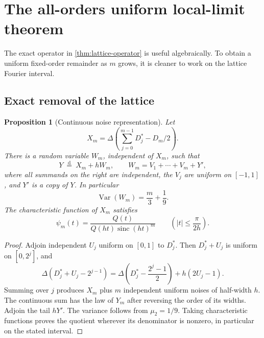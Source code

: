 \documentclass[11pt,a4paper]{article}
\numberwithin{equation}{section}
\newtheorem{proposition}[proposition]{Proposition}
\theoremstyle{definition}
\newcommand{\sinc}{\operatorname{sinc}}
\begin{document}
\section{The all-orders uniform local-limit theorem}\label{sec:local-limit}

The exact operator in \cref{thm:lattice-operator} is useful
algebraically. To obtain a uniform fixed-order remainder as $m$ grows,
it is cleaner to work on the lattice Fourier interval.

\subsection{Exact removal of the lattice}

\begin{proposition}[Continuous noise representation]\label{prop:dequantization}
Let
\begin{equation}
 X_m=\Delta\left(\sum_{j=0}^{m-1}D_j^*-D_m/2\right).
\end{equation}
There is a random variable $W_m$, independent of $X_m$, such that
\begin{equation}
 Y\ \overset{\mathrm d}=\ X_m+hW_m,
 \qquad W_m=V_1+\cdots+V_m+Y',
 \label{eq:dequantization}
\end{equation}
where all summands on the right are independent, the $V_j$ are
uniform on $[-1,1]$, and $Y'$ is a copy of $Y$. In particular
\begin{equation}
 \operatorname{Var}(W_m)=\frac m3+\frac19.
 \label{eq:noise-variance}
\end{equation}
The characteristic function of $X_m$ satisfies
\begin{equation}
 \psi_m(t)=\frac{Q(t)}{Q(ht)\sinc(ht)^m}
 \qquad\left(|t|\leq\frac{\pi}{2h}\right).
 \label{eq:psi-quotient}
\end{equation}
\end{proposition}
\begin{proof}
Adjoin independent $U_j$ uniform on $[0,1]$ to $D_j^*$. Then
$D_j^*+U_j$ is uniform on $[0,2^j]$, and
\begin{equation}
 \Delta\left(D_j^*+U_j-2^{j-1}\right)
 =\Delta\left(D_j^*-\frac{2^j-1}{2}\right)+h(2U_j-1).
\end{equation}
Summing over $j$ produces $X_m$ plus $m$ independent uniform
noises of half-width $h$. The continuous sum has the law of $Y_m$
after reversing the order of its widths. Adjoin the tail $hY'$.
The variance follows from $\mu_2=1/9$. Taking characteristic
functions proves the quotient wherever its denominator is nonzero,
in particular on the stated interval.
\end{proof}
\end{document}
